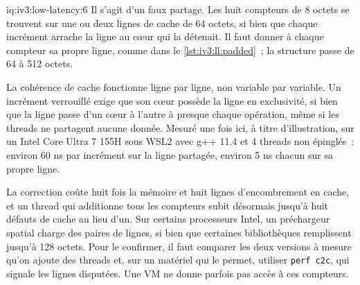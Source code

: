 \begin{solution}{iq:iv3:low-latency:6}
Il s'agit d'un faux partage. Les huit compteurs de 8 octets se trouvent sur une ou deux lignes de cache de 64 octets, si bien que chaque incrément arrache la ligne au cœur qui la détenait. Il faut donner à chaque compteur sa propre ligne, comme dans le \cref{lst:iv3:ll:padded}~; la structure passe de 64 à 512 octets.
\label{lst:iv3:ll:padded}

La cohérence de cache fonctionne ligne par ligne, non variable par variable. Un incrément verrouillé exige que son cœur possède la ligne en exclusivité, si bien que la ligne passe d'un cœur à l'autre à presque chaque opération, même si les threads ne partagent aucune donnée. Mesuré une fois ici, à titre d'illustration, sur un Intel Core Ultra 7 155H sous WSL2 avec g++ 11.4 et 4 threads non épinglés~: environ 60 ns par incrément sur la ligne partagée, environ 5 ns chacun sur sa propre ligne.

La correction coûte huit fois la mémoire et huit lignes d'encombrement en cache, et un thread qui additionne tous les compteurs subit désormais jusqu'à huit défauts de cache au lieu d'un. Sur certains processeurs Intel, un préchargeur spatial charge des paires de lignes, si bien que certaines bibliothèques remplissent jusqu'à 128 octets. Pour le confirmer, il faut comparer les deux versions à mesure qu'on ajoute des threads et, sur un matériel qui le permet, utiliser \texttt{perf c2c}, qui signale les lignes disputées. Une VM ne donne parfois pas accès à ces compteurs.

\end{solution}

